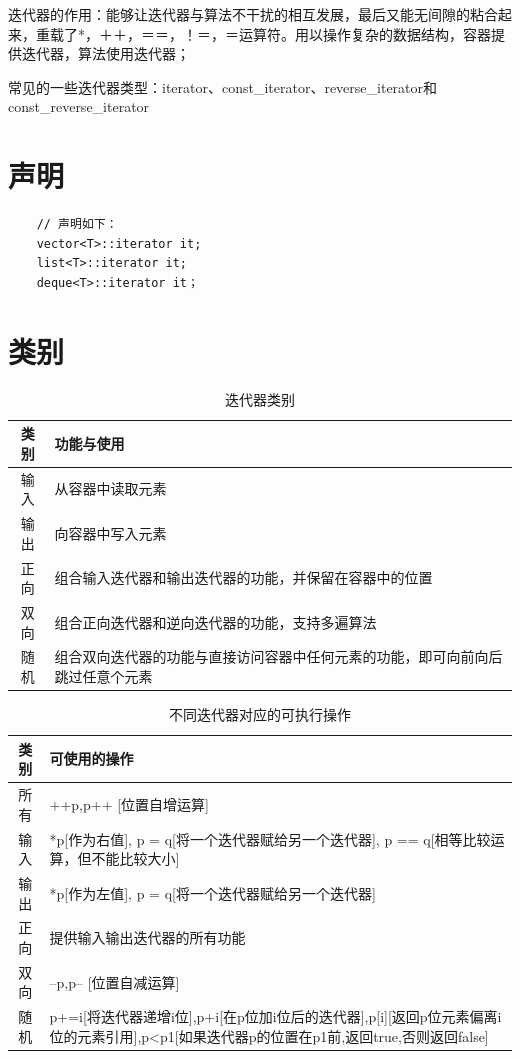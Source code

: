 \documentclass[UTF8,a4paper,12pt]{ctexbook}
\begin{document}
		迭代器的作用：能够让迭代器与算法不干扰的相互发展，最后又能无间隙的粘合起来，重载了*，＋＋，＝＝，！＝，＝运算符。用以操作复杂的数据结构，容器提供迭代器，算法使用迭代器；
		
		常见的一些迭代器类型：iterator、const\_iterator、reverse\_iterator和const\_reverse\_iterator
	\section{声明}
		\begin{lstlisting}
	// 声明如下：
	vector<T>::iterator it;
	list<T>::iterator it;
	deque<T>::iterator it；
		\end{lstlisting}
	\section{类别}
		\begin{table}[H]
			\centering
			\caption{迭代器类别}
			\begin{tabular}{c|m{15cm}}
				\hline 
				类别 & 功能与使用\\
				\hline
				输入	& 从容器中读取元素\\
				输出  & 向容器中写入元素\\
				正向  & 组合输入迭代器和输出迭代器的功能，并保留在容器中的位置\\
				双向  & 组合正向迭代器和逆向迭代器的功能，支持多遍算法\\
				随机  & 组合双向迭代器的功能与直接访问容器中任何元素的功能，即可向前向后跳过任意个元素\\
				\hline
				\end{tabular}
			\end{table}	
			
			\begin{table}[h]
				\centering
				\caption{不同迭代器对应的可执行操作}
				\begin{tabular}{c|m{15cm}}
					\hline 
					类别 & 可使用的操作\\
					\hline
					所有  & ++p,p++ [位置自增运算]\\
					\hline
					输入  & *p[作为右值], p = q[将一个迭代器赋给另一个迭代器], p == q[相等比较运算，但不能比较大小]\\
					\hline
					输出  & *p[作为左值], p = q[将一个迭代器赋给另一个迭代器]\\
					\hline
					正向  & 提供输入输出迭代器的所有功能\\
					\hline
					双向  & --p,p-- [位置自减运算]\\
					\hline
					随机  & p+=i[将迭代器递增i位],p+i[在p位加i位后的迭代器],p[i][返回p位元素偏离i位的元素引用],p<p1[如果迭代器p的位置在p1前,返回true,否则返回false]\\
					\hline
				\end{tabular}
			\end{table}
			
\end{document}
